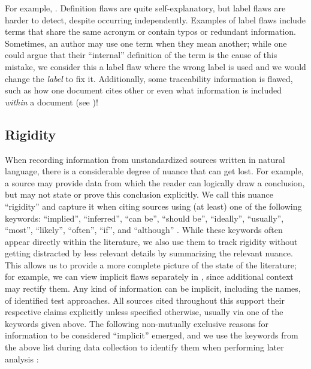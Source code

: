 \label{label-flaw-def}
For example, . Definition flaws are quite self-explanatory, but
label flaws are harder to detect, despite occurring independently. Examples of
label flaws include terms that share the same acronym or contain typos or
redundant information. Sometimes, an author may use one term when they mean
another; while one could argue that their ``internal'' definition of the term
is the cause of this mistake, we consider this a label flaw where the wrong
label is used and we would change the \emph{label} to fix it.
\label{trace-flaw-def}%
Additionally, some traceability information is flawed, such as how one document
cites other or even what information is included \emph{within} a document
(see )!

\subsection{Rigidity}\label{rigidity}

\def\impKeywordsCode{\seeSrcCode{82167b7}{scripts/helpers.py}{21}{49}}

When recording information from unstandardized sources written in natural
language, there is a considerable degree of nuance that can get lost. For
example, a source may provide data from which the reader can logically draw a
conclusion, but may not state or prove this conclusion explicitly.
We call this nuance ``rigidity'' and capture it when citing sources using
(at least) one of the following keywords: ``implied'', ``inferred'',
``can be'', ``should be'', ``ideally'', ``usually'', ``most'', ``likely'',
``often'', ``if'', and ``although''%
. While these keywords often appear
directly within the literature, we also use them to track rigidity without
getting distracted by less relevant details by summarizing the relevant
nuance. This allows us to provide a more complete picture of the state of
the literature; for example, we can view implicit flaws separately in
, since additional context may rectify
them. Any kind of information can be implicit, including the names,
\approachFields{} of identified test approaches. All sources cited throughout
this \docType{} support their respective
claims explicitly unless specified otherwise, usually via one of the
keywords given above. The following non-mutually
exclusive reasons for information to be considered ``implicit'' emerged, and we
use the keywords from the above list during data collection to identify them
when performing later analysis \impKeywordsCode{}:

